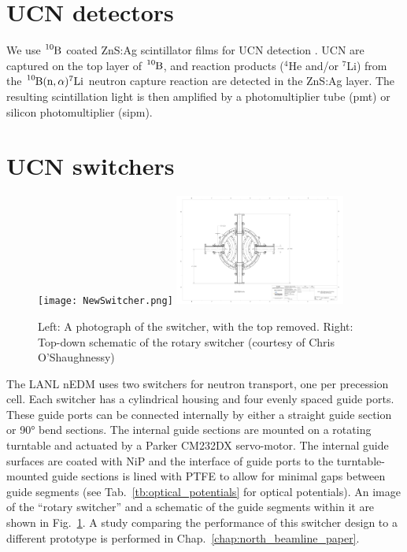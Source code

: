 
\section{UCN detectors}\label{sec:ucn_detectors}


We use $\ce{^{10}B}$ coated ZnS:Ag scintillator films for UCN detection \cite{jeph_b10_2011}. UCN are captured on the top layer of $\ce{^{10}B}$, and reaction products ($^4$He and/or $^7$Li) from the $\ce{^{10}B}(\text{n},\alpha)^7\text{Li}$ neutron capture reaction are detected in the ZnS:Ag layer. The resulting scintillation light is then amplified by a photomultiplier tube (\acrshort*{pmt}) or silicon photomultiplier (\acrshort*{sipm}).


\section{UCN switchers}\label{sec:lanl_switchers}


\begin{figure}
    \centering
    \texttt{[image: NewSwitcher.png]}
    \hspace{1em}
    \includegraphics[width=0.5\textwidth]{figures/switcher_schematic.pdf}
    \caption[Photograph and schematic of rotary switcher]{Left: A photograph of the switcher, with the top removed. Right: Top-down schematic of the rotary switcher (courtesy of Chris O'Shaughnessy) }\label{fig:NewSwitcher}
\end{figure}

The LANL nEDM uses two switchers for neutron transport, one per precession cell. Each switcher has a cylindrical housing and four evenly spaced guide ports. These guide ports can be connected internally by either a straight guide section or \ang{90} bend sections. The internal guide sections are mounted on a rotating turntable and actuated by a Parker CM232DX servo-motor. The internal guide surfaces are coated with NiP and the interface of guide ports to the turntable-mounted guide sections is lined with PTFE to allow for minimal gaps between guide segments (see Tab.~\ref{tb:optical_potentials} for optical potentials). An image of the ``rotary switcher'' and a schematic of the guide segments within it are shown in Fig.~\ref{fig:NewSwitcher}. A study comparing the performance of this switcher design to a different prototype is performed in Chap.~\ref{chap:north_beamline_paper}.

